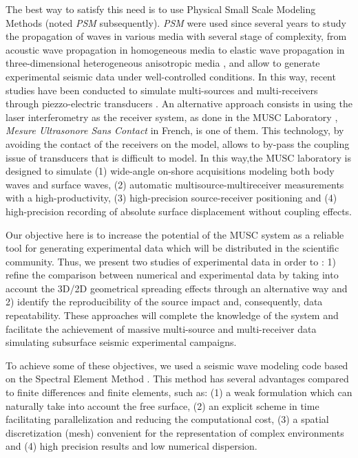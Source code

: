 \documentclass[manuscript,revised]{geophysics}
\newcommand{\psm}{\textit{PSM} }
\newcommand{\thrd}{three-dimensional }
\begin{document}
\noindent The best way to satisfy this need is to use Physical Small Scale Modeling Methods (noted \psm subsequently). \psm were used since several years to study the propagation of waves in various media with several stage of complexity, from acoustic wave propagation in homogeneous media to elastic wave propagation in \thrd heterogeneous anisotropic media \citep{Rieber_EWP_1936,Howes_SMS_1953,Hilterman_TDM_1970,French_MRP_1974,Bishop_LVM_1985,Pratt_FWI_1999,Favretto_NMT_2013,Sarkar_TPM_2003,Isaac_SMS_1999}, and allow to generate experimental seismic data under well-controlled conditions. In this way, recent studies have been conducted to simulate multi-sources and multi-receivers through piezzo-electric transducers \citep{Wong_SPM_2009}. An alternative approach consists in using the laser interferometry as the receiver system, as done in the MUSC Laboratory \citep{Bretaudeau_SSA_2008b,Bretaudeau_SSM_2011,Bretaudeau_FWI_2013}, \textit{Mesure Ultrasonore Sans Contact} in French, is one of them. This technology, by avoiding the contact of the receivers on the model, allows to by-pass the coupling issue of transducers that is difficult to model. In this way,the MUSC laboratory is designed to simulate (1) wide-angle on-shore acquisitions modeling both body waves and surface waves, (2) automatic multisource-multireceiver measurements with a high-productivity, (3) high-precision source-receiver positioning and (4) high-precision recording of absolute surface displacement without coupling effects. 

\noindent Our objective here is to increase the potential of the MUSC system as a reliable tool for generating experimental data which will be distributed in the scientific community. 
\noindent Thus, we present two studies of experimental data in order to : 1) refine the comparison between numerical and experimental data by taking into account the 3D/2D geometrical spreading effects through an alternative way and 2) identify the reproducibility of the source impact and, consequently, data repeatability. These approaches will complete the knowledge of the system and facilitate the achievement of massive multi-source and multi-receiver data simulating subsurface seismic experimental campaigns.

\noindent To achieve some of these objectives, we used a seismic wave modeling code based on the Spectral Element Method \citep{Komatitsch_SEM_1998,Komatitsch_ISM_1999,Komatitsch_SEM_2005,Festa_PML_2005}. This method has several advantages compared to finite differences and finite elements, such as: (1) a weak formulation which can naturally take into account the free surface, (2) an explicit scheme in time facilitating parallelization and reducing the computational cost, (3) a spatial discretization (mesh) convenient for the representation of complex environments and (4) high precision results and low numerical dispersion.
\end{document}
